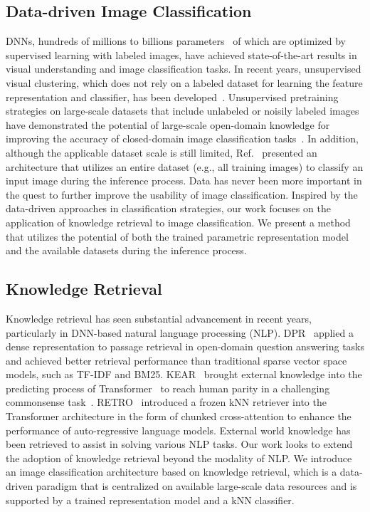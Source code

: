 \documentclass[runningheads]{llncs}
\begin{document}
\subsection{Data-driven Image Classification}
\label{sec:rw_knowledge}

DNNs, hundreds of millions to billions parameters~\cite{ViT,CCT,CoAtNet,PyramidViT}
of which are optimized by supervised learning with labeled images, have achieved state-of-the-art results
in visual understanding and image classification tasks.
In recent years, unsupervised visual clustering, which does not rely on a labeled dataset for learning 
the feature representation and classifier, has been developed~\cite{ID,SimCLR,MOCO,MOCOV2,CLD,MAE,NNCLR}.
Unsupervised pretraining strategies on large-scale datasets that include unlabeled or noisily labeled images have demonstrated
the potential of large-scale open-domain knowledge for improving the accuracy of closed-domain image classification tasks~\cite{ViT,ALIGN,CLIP}.
In addition, although the applicable dataset scale is still limited, Ref.~\cite{datapoints_attention} presented an architecture that utilizes an entire dataset (e.g., all training images) to classify an input image during the inference process.
Data has never been more important in the quest to further improve the usability of image classification.
Inspired by the data-driven approaches in classification strategies, 
our work focuses on the application of knowledge retrieval to image classification.
We present a method
that utilizes the potential of both the trained parametric representation model and the available 
datasets during the inference process.


\subsection{Knowledge Retrieval}
\label{sec:rw_knowledge}

Knowledge retrieval has seen substantial advancement in recent years, particularly in DNN-based natural language processing (NLP).
DPR~\cite{DPR} applied a dense representation to passage retrieval in open-domain question answering tasks
and achieved better retrieval performance than traditional sparse vector space
models, such as TF-IDF and BM25. KEAR~\cite{hummancommonsense} brought external knowledge into the predicting 
process of Transformer~\cite{Transformer} to reach human parity in a challenging commonsense task~\cite{CommonsenseQA}.
RETRO~\cite{RETRO} introduced a frozen kNN retriever into the
Transformer architecture in the form of chunked cross-attention to enhance the performance of 
auto-regressive language models. External world knowledge has been retrieved to assist in solving
various NLP tasks. Our work looks to extend the adoption of knowledge retrieval beyond the modality of NLP.
We introduce an image classification architecture based on knowledge retrieval, which is a data-driven paradigm that is centralized
on available large-scale data resources and is supported by a trained representation model and a kNN classifier.
\end{document}
